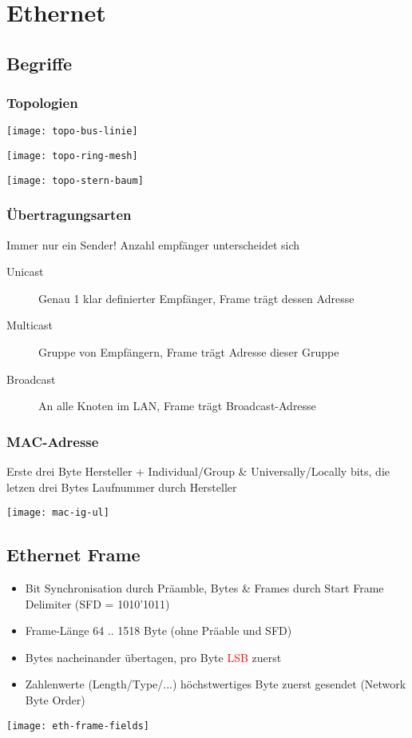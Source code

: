 \section{Ethernet}
\subsection{Begriffe}

\subsubsection{Topologien}
\begin{center}
	\texttt{[image: topo-bus-linie]}

	\texttt{[image: topo-ring-mesh]}

	\texttt{[image: topo-stern-baum]}
\end{center}

\subsubsection{Übertragungsarten}
Immer nur ein Sender! Anzahl empfänger unterscheidet sich

\begin{description}
	\item[Unicast] Genau 1 klar definierter Empfänger, Frame trägt dessen Adresse
	\item[Multicast] Gruppe von Empfängern, Frame trägt Adresse dieser Gruppe
	\item[Broadcast] An alle Knoten im LAN, Frame trägt Broadcast-Adresse
\end{description}

\subsubsection{MAC-Adresse}

Erste drei Byte Hersteller + Individual/Group \& Universally/Locally bits,
die letzen drei Bytes Laufnummer durch Hersteller

\begin{center}
	\texttt{[image: mac-ig-ul]}
\end{center}




\subsection{Ethernet Frame}
\begin{itemize}
	\item Bit Synchronisation durch Präamble, Bytes \& Frames durch Start
	      Frame Delimiter (SFD = 1010'1011)
	\item Frame-Länge 64 .. 1518 Byte (ohne Präable und SFD)
	\item Bytes nacheinander übertagen, pro Byte \textcolor{red}{LSB} zuerst
	\item Zahlenwerte (Length/Type/...) höchstwertiges Byte zuerst gesendet
	      (Network Byte Order)
\end{itemize}
\texttt{[image: eth-frame-fields]}

